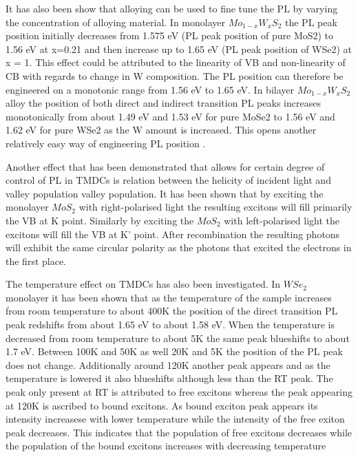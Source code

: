 	It has also been show that alloying can be used to fine tune the PL by varying the concentration of alloying material. In monolayer $Mo_{1-x}W_xS_2$ the PL peak position initially decreases from 1.575 eV (PL peak position of pure MoS2) to 1.56 eV at x=0.21 and then increase up to 1.65 eV (PL peak position of WSe2) at x = 1. This effect could be attributed to the linearity of VB and non-linearity of CB with regards to change in W composition. The PL position can therefore be engineered on a monotonic range from 1.56 eV to 1.65 eV. In bilayer $Mo_{1-x}W_xS_2$ alloy the position of both direct and indirect transition PL peaks increases monotonically from about 1.49 eV and 1.53 eV for pure MoSe2 to 1.56 eV and 1.62 eV for pure WSe2 as the W amount is increased. This opens another relatively easy way of engineering PL position \cite{Zhang2014}.
	
	Another effect that has been demonstrated that allows for certain degree of control of PL in TMDCs is relation between the helicity of incident light and valley population valley population. It has been shown that by exciting the monolayer $MoS_2$ with right-polarised light the resulting excitons will fill primarily the VB at K point. Similarly by exciting the $MoS_2$ with left-polarised light the excitons will fill the VB at K' point. After recombination the resulting photons will exhibit the same circular polarity as the photons that excited the electrons in the first place. \cite{Mak2012}\cite{Mak2012a}
	
	The temperature effect on TMDCs has also been investigated. In $WSe_2$ monolayer it has been shown that as the temperature of the sample increases from room temperature to about 400K the position of the direct transition PL peak redshifts from about 1.65 eV to about 1.58 eV. When the temperature is decreased from room temperature to about 5K the same peak blueshifts to about 1.7 eV. Between 100K and 50K as well 20K and 5K the position of the PL peak does not change. Additionally around 120K another peak appears and as the temperature is lowered it also blueshifts although less than the RT peak. The peak only present at RT is attributed to free excitons whereas the peak appearing at 120K is ascribed to bound excitons. As bound exciton peak appears its intensity increasese with lower temperature while the intensity of the free exiton peak decreases. This indicates that the population of free excitons decreases while the population of the bound excitons increases with decreasing temperature \cite{PhotoluminescencePropertiesAndExcitonDynamicsInMonolayerWSe2}
	
